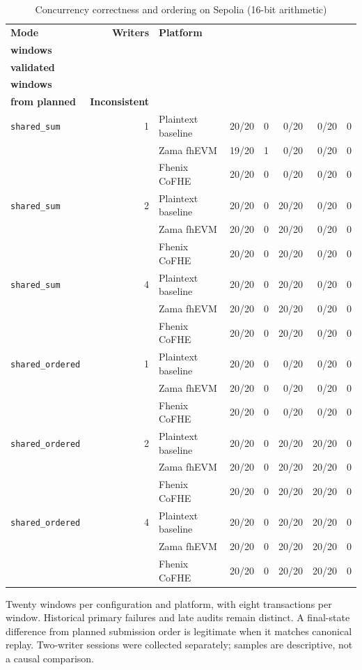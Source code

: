 \begin{table}[!t]
\caption{Concurrency correctness and ordering on Sepolia (16-bit arithmetic)}
\label{tab:concurrency-correctness}
\centering\scriptsize
\setlength{\tabcolsep}{3pt}
\begin{tabular}{|l|r|l|r|r|r|r|r|}\hline
\textbf{Mode} & \textbf{Writers} & \textbf{Platform} & \shortstack{\textbf{Primary valid}\\\textbf{windows}} & \shortstack{\textbf{Late}\\\textbf{validated}} & \shortstack{\textbf{Reordered}\\\textbf{windows}} & \shortstack{\textbf{Final differs}\\\textbf{from planned}} & \textbf{Inconsistent} \\
\hline
\texttt{shared\_sum} & 1 & Plaintext baseline & 20/20 & 0 & 0/20 & 0/20 & 0 \\
 &  & Zama fhEVM & 19/20 & 1 & 0/20 & 0/20 & 0 \\
 &  & Fhenix CoFHE & 20/20 & 0 & 0/20 & 0/20 & 0 \\
\hline
\texttt{shared\_sum} & 2 & Plaintext baseline & 20/20 & 0 & 20/20 & 0/20 & 0 \\
 &  & Zama fhEVM & 20/20 & 0 & 20/20 & 0/20 & 0 \\
 &  & Fhenix CoFHE & 20/20 & 0 & 20/20 & 0/20 & 0 \\
\hline
\texttt{shared\_sum} & 4 & Plaintext baseline & 20/20 & 0 & 20/20 & 0/20 & 0 \\
 &  & Zama fhEVM & 20/20 & 0 & 20/20 & 0/20 & 0 \\
 &  & Fhenix CoFHE & 20/20 & 0 & 20/20 & 0/20 & 0 \\
\hline
\texttt{shared\_ordered} & 1 & Plaintext baseline & 20/20 & 0 & 0/20 & 0/20 & 0 \\
 &  & Zama fhEVM & 20/20 & 0 & 0/20 & 0/20 & 0 \\
 &  & Fhenix CoFHE & 20/20 & 0 & 0/20 & 0/20 & 0 \\
\hline
\texttt{shared\_ordered} & 2 & Plaintext baseline & 20/20 & 0 & 20/20 & 20/20 & 0 \\
 &  & Zama fhEVM & 20/20 & 0 & 20/20 & 20/20 & 0 \\
 &  & Fhenix CoFHE & 20/20 & 0 & 20/20 & 20/20 & 0 \\
\hline
\texttt{shared\_ordered} & 4 & Plaintext baseline & 20/20 & 0 & 20/20 & 20/20 & 0 \\
 &  & Zama fhEVM & 20/20 & 0 & 20/20 & 20/20 & 0 \\
 &  & Fhenix CoFHE & 20/20 & 0 & 20/20 & 20/20 & 0 \\
\hline
\end{tabular}\par\smallskip
\begin{minipage}{\textwidth}\scriptsize Twenty windows per configuration and platform, with eight transactions per window. Historical primary failures and late audits remain distinct. A final-state difference from planned submission order is legitimate when it matches canonical replay. Two-writer sessions were collected separately; samples are descriptive, not a causal comparison.\end{minipage}
\end{table}

